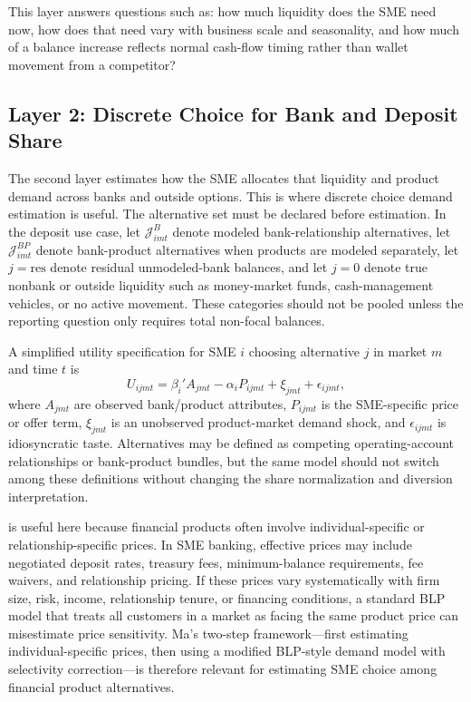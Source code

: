 \documentclass[11pt]{article}
\begin{document}
This layer answers questions such as: how much liquidity does the SME need now,
how does that need vary with business scale and seasonality, and how much of a
balance increase reflects normal cash-flow timing rather than wallet movement
from a competitor?

\subsection{Layer 2: Discrete Choice for Bank and Deposit Share}

The second layer estimates how the SME allocates that liquidity and product
demand across banks and outside options. This is where discrete
choice demand estimation is useful. The alternative set must be declared before
estimation. In the deposit use case, let $\mathcal{J}_{imt}^{B}$ denote modeled
bank-relationship alternatives, let $\mathcal{J}_{imt}^{BP}$ denote
bank-product alternatives when products are modeled separately, let
$j=\mathrm{res}$ denote residual unmodeled-bank balances, and let
$j=0$ denote true nonbank or outside liquidity such as money-market funds,
cash-management vehicles, or no active movement. These categories should not
be pooled unless the reporting question only requires total non-focal
balances.

A simplified utility specification for SME $i$ choosing alternative $j$ in
market $m$ and time $t$ is
\[
  U_{ijmt}
  =
  \beta_i' A_{jmt}
  - \alpha_i P_{ijmt}
  + \xi_{jmt}
  + \epsilon_{ijmt},
\]
where $A_{jmt}$ are observed bank/product attributes, $P_{ijmt}$ is the
SME-specific price or offer term, $\xi_{jmt}$ is an unobserved product-market
demand shock, and $\epsilon_{ijmt}$ is idiosyncratic taste. Alternatives may be
defined as competing operating-account relationships or bank-product bundles,
but the same model should not switch among these definitions without changing
the share normalization and diversion interpretation.

\citet{ma2024discrete} is useful here because financial products often involve
individual-specific or relationship-specific prices. In SME banking, effective
prices may include negotiated deposit rates, treasury fees,
minimum-balance requirements, fee waivers, and relationship pricing. If these
prices vary systematically with firm size, risk, income, relationship tenure,
or financing conditions, a standard BLP model that treats all
customers in a market as facing the same product price can misestimate price
sensitivity. Ma's two-step framework---first estimating individual-specific
prices, then using a modified BLP-style demand model with selectivity
correction---is therefore relevant for estimating SME choice among financial
product alternatives.
\end{document}
